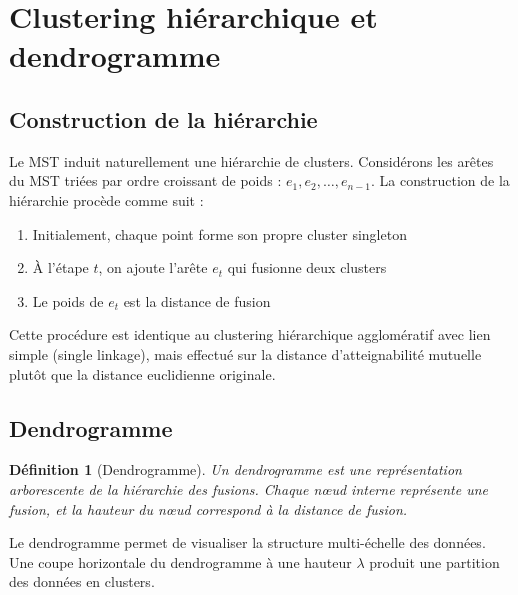 \documentclass[11pt,a4paper]{article}
\newtheorem{definition}{Définition}[section]
\begin{document}
\section{Clustering hiérarchique et dendrogramme}

\subsection{Construction de la hiérarchie}

Le MST induit naturellement une hiérarchie de clusters. Considérons les arêtes du MST triées par ordre croissant de poids : $e_1, e_2, \ldots, e_{n-1}$. La construction de la hiérarchie procède comme suit :

\begin{enumerate}
    \item Initialement, chaque point forme son propre cluster singleton
    \item À l'étape $t$, on ajoute l'arête $e_t$ qui fusionne deux clusters
    \item Le poids de $e_t$ est la distance de fusion
\end{enumerate}

Cette procédure est identique au clustering hiérarchique agglomératif avec lien simple (single linkage), mais effectué sur la distance d'atteignabilité mutuelle plutôt que la distance euclidienne originale.

\subsection{Dendrogramme}

\begin{definition}[Dendrogramme]
Un \textit{dendrogramme} est une représentation arborescente de la hiérarchie des fusions. Chaque nœud interne représente une fusion, et la hauteur du nœud correspond à la distance de fusion.
\end{definition}

Le dendrogramme permet de visualiser la structure multi-échelle des données. Une coupe horizontale du dendrogramme à une hauteur $\lambda$ produit une partition des données en clusters.
\end{document}
